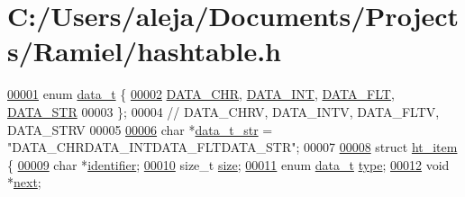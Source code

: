 \hypertarget{hashtable_8h_source}{}\section{C\+:/\+Users/aleja/\+Documents/\+Projects/\+Ramiel/hashtable.h}

\begin{DoxyCode}
\mbox{\hyperlink{hashtable_8h_adb5f3584b941a8dc0fed6b7302b4b8eb}{00001}} \textcolor{keyword}{enum} \mbox{\hyperlink{hashtable_8h_adb5f3584b941a8dc0fed6b7302b4b8eb}{data\_t}} \{
\mbox{\hyperlink{hashtable_8h_adb5f3584b941a8dc0fed6b7302b4b8ebadf20fd086f01e2210f800cdcd1d418fa}{00002}}     \mbox{\hyperlink{hashtable_8h_adb5f3584b941a8dc0fed6b7302b4b8ebad69d65193d78a3137f69e92cc4d7a3f9}{DATA\_CHR}}, \mbox{\hyperlink{hashtable_8h_adb5f3584b941a8dc0fed6b7302b4b8ebafe7285c6e78d568533884f6c5f9945a1}{DATA\_INT}}, \mbox{\hyperlink{hashtable_8h_adb5f3584b941a8dc0fed6b7302b4b8eba8d90344fc52f881c2f7f42ecead3c59f}{DATA\_FLT}}, \mbox{\hyperlink{hashtable_8h_adb5f3584b941a8dc0fed6b7302b4b8ebadf20fd086f01e2210f800cdcd1d418fa}{DATA\_STR}}
00003 \};
00004     \textcolor{comment}{// DATA\_CHRV, DATA\_INTV, DATA\_FLTV, DATA\_STRV}
00005 
\mbox{\hyperlink{hashtable_8h_ab774c94e0c0e48d8cc354cd54f7a88c2}{00006}} \textcolor{keywordtype}{char} *\mbox{\hyperlink{hashtable_8h_ab774c94e0c0e48d8cc354cd54f7a88c2}{data\_t\_str}} = \textcolor{stringliteral}{"DATA\_CHRDATA\_INTDATA\_FLTDATA\_STR"};
00007 
\mbox{\hyperlink{structht__item}{00008}} \textcolor{keyword}{struct }\mbox{\hyperlink{structht__item}{ht\_item}} \{
\mbox{\hyperlink{structht__item_af5351a0143adaf16c64b881aee01d893}{00009}}     \textcolor{keywordtype}{char} *\mbox{\hyperlink{structht__item_af5351a0143adaf16c64b881aee01d893}{identifier}};
\mbox{\hyperlink{structht__item_a854352f53b148adc24983a58a1866d66}{00010}}     \textcolor{keywordtype}{size\_t} \mbox{\hyperlink{structht__item_a854352f53b148adc24983a58a1866d66}{size}};
\mbox{\hyperlink{structht__item_a0c6169f5c94682132bbbe974784559e6}{00011}}     \textcolor{keyword}{enum} \mbox{\hyperlink{hashtable_8h_adb5f3584b941a8dc0fed6b7302b4b8eb}{data\_t}} \mbox{\hyperlink{structht__item_a0c6169f5c94682132bbbe974784559e6}{type}};
\mbox{\hyperlink{structht__item_a75b19ffcca77bfc647ff02695958fd95}{00012}}     \textcolor{keywordtype}{void} *\mbox{\hyperlink{structht__item_a75b19ffcca77bfc647ff02695958fd95}{next}};

\end{DoxyCode}
